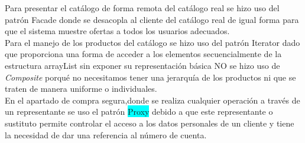 \documentclass[a4paper,12pt]{article}
\begin{document}
   Para presentar el catálogo de forma remota del catálogo real se hizo uso del patrón \colorbox{brightube}{Facade} donde se desacopla al cliente del catálogo real de igual forma para que el sistema muestre ofertas
   a todos los usuarios adecuados. \\

   Para el manejo de los productos del catálogo se hizo uso del patrón \colorbox{applegreen}{Iterator} dado que proporciona una forma de acceder a los elementos secuencialmente de la estructura arrayList sin exponer su representación
   básica NO se hizo uso de \textit{Composite} porqué no necesitamos tener una jerarquía de los productos ni que se traten de manera uniforme o individuales.\\

   En el apartado de compra segura,donde se realiza cualquier operación a través de un representante se uso el patrón \colorbox{cyan}{Proxy} debido a que este representante o sustituto permite controlar el 
   acceso a los datos personales de un cliente y tiene la necesidad de dar una referencia al número de cuenta. 
\end{document}
